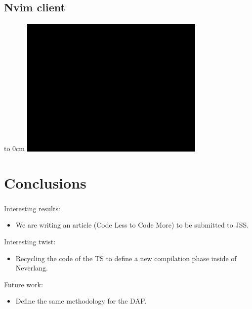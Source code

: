 \documentclass[9pt,xcolor=table,svgnames]{beamer}
\begin{document}
\subsection[]{Nvim client}
\begin{frame}{\secname}
    \framesubtitle{\subsecname}
    {\hspace*{6cm}\vbox to 0cm {\vspace*{4cm}\includegraphics[width=9cm]{./figs/black_rect.png}}}
    \begin{center}
    \end{center}
\end{frame}



\section{Conclusions}

\begin{frame}
    \frametitle{\secname}

    \Large Interesting results:
    \normalsize
    \begin{itemize}
        \item We are writing an article (\alert{Code Less to Code More}) to be submitted to \alert{JSS}.
    \end{itemize}

    \bigskip
    \Large Interesting twist:
    \normalsize
    \begin{itemize}
        \item Recycling the code of the \alert{TS} to define a new compilation phase inside of \alert{Neverlang}.
    \end{itemize}

    \bigskip
    \Large Future work:
    \normalsize
    \begin{itemize}
        \item Define the same methodology for the \alert{DAP}.
    \end{itemize}

\end{frame}
\end{document}
